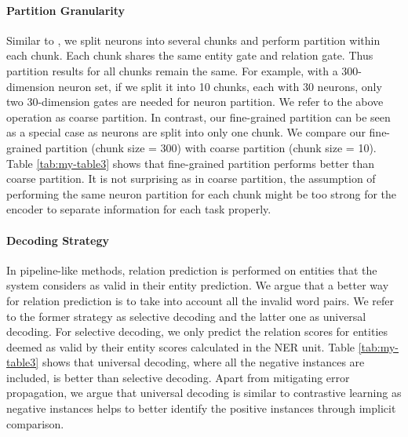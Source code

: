 \documentclass[11pt]{article}
\begin{document}
\paragraph{Partition Granularity}
Similar to \citep{shen2018ordered}, we split neurons into several chunks and perform partition within each chunk. Each chunk shares the same entity gate and relation gate. Thus partition results for all chunks remain the same. For example, with a 300-dimension neuron set, if we split it into 10 chunks, each with 30 neurons, only two 30-dimension gates are needed for neuron partition. We refer to the above operation as coarse partition. In contrast, our fine-grained partition can be seen as a special case as neurons are split into only one chunk.  We compare our fine-grained partition (chunk size = 300) with coarse partition (chunk size = 10). Table \ref{tab:my-table3} shows that fine-grained partition performs better than coarse partition. It is not surprising as in coarse partition, the assumption of performing the same neuron partition for each chunk might be too strong for the encoder to separate information for each task properly. 

\paragraph{Decoding Strategy}
In pipeline-like methods, relation prediction is performed on entities that the system considers as valid in their entity prediction. We argue that a better way for relation prediction is to take into account all the invalid word pairs. We refer to the former strategy as selective decoding and the latter one as universal decoding. For selective decoding, we only predict the relation scores for entities deemed as valid by their entity scores calculated in the NER unit.  Table \ref{tab:my-table3} shows that universal decoding, where all the negative instances are included, is better than selective decoding. Apart from mitigating error propagation, we argue that universal decoding is similar to contrastive learning as negative instances helps to better identify the positive instances through implicit comparison.
\end{document}
